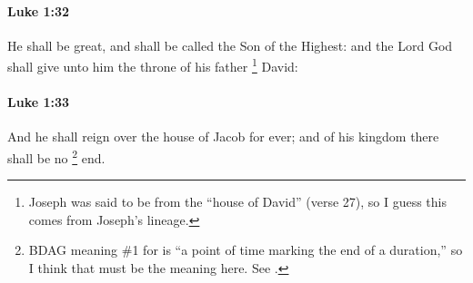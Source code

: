 		\paragraph{Luke 1:32} %
			\label{LUKE-1-32}

			He shall be great, and shall be called the Son of the Highest: and the Lord God shall give unto him the throne of his father
				\footnote{%
					Joseph was said to be from the ``house of David'' (verse 27), so I guess this comes from Joseph's lineage.
					}%
			David:

			\begin{framed}
			\scriptsize
				\begin{compactdesc}
					\item[SBLG] 
				\end{compactdesc}
			\end{framed}

		\paragraph{Luke 1:33} %
			\label{LUKE-1-33}

			And he shall reign over the house of Jacob for ever; and of his kingdom there shall be no
				\footnote{%
					BDAG meaning \#1 for  is ``a point of time marking the end of a duration,'' so I think that must be the meaning here. See \hyperref[TELOS]{}.
					}%
			end.

